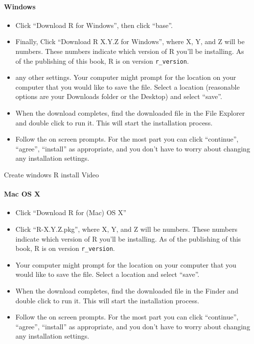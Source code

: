 \documentclass[
]{article}
\providecommand{\tightlist}{%
  \setlength{\itemsep}{0pt}\setlength{\parskip}{0pt}}
\newenvironment{video}{
  \specialblock{video}{vidicon-fill.png}{Video}
}{\endspecialblock}
\begin{document}
\hypertarget{windows}{%
\paragraph{Windows}\label{windows}}

\begin{itemize}
\tightlist
\item
  Click ``Download R for Windows'', then click ``base''.
\item
  Finally, Click ``Download R X.Y.Z for Windows'', where X, Y, and Z will be numbers. These numbers indicate which version of R you'll be installing. As of the publishing of this book, R is on version \texttt{r\_version}.
\item
  any other settings. Your computer might prompt for the location on your computer that you would like to save the file. Select a location (reasonable options are your Downloads folder or the Desktop) and select ``save''.
\item
  When the download completes, find the downloaded file in the File Explorer and double click to run it. This will start the installation process.
\item
  Follow the on screen prompts. For the most part you can click ``continue'', ``agree'', ``install'' as appropriate, and you don't have to worry about changing any installation settings.
\end{itemize}

\begin{video}
Create windows R install Video
\end{video}

\hypertarget{mac-os-x}{%
\paragraph{Mac OS X}\label{mac-os-x}}

\begin{itemize}
\tightlist
\item
  Click ``Download R for (Mac) OS X''
\item
  Click ``R-X.Y.Z.pkg'', where X, Y, and Z will be numbers. These numbers indicate which version of R you'll be installing. As of the publishing of this book, R is on version \texttt{r\_version}.
\item
  Your computer might prompt for the location on your computer that you would like to save the file. Select a location and select ``save''.
\item
  When the download completes, find the downloaded file in the Finder and double click to run it. This will start the installation process.
\item
  Follow the on screen prompts. For the most part you can click ``continue'', ``agree'', ``install'' as appropriate, and you don't have to worry about changing any installation settings.
\end{itemize}
\end{document}
